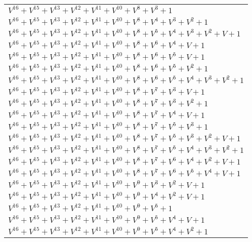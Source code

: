 \documentclass[12pt]{article}
\begin{document}
\begin{adjustwidth}{-4cm}{}
\begin{center}
\begin{longtable}{|l|}
$V^{16}  +V^{15}  +V^{13}  +V^{12}  +V^{11}  +V^{10}  +V^{8}  +V^{3}  + 1$ \\
$V^{16}  +V^{15}  +V^{13}  +V^{12}  +V^{11}  +V^{10}  +V^{8}  +V^{4}  +V^{3}  +V^{2}  + 1$ \\
$V^{16}  +V^{15}  +V^{13}  +V^{12}  +V^{11}  +V^{10}  +V^{8}  +V^{5}  +V^{4}  +V^{3}  +V^{2}  + V + 1$ \\
$V^{16}  +V^{15}  +V^{13}  +V^{12}  +V^{11}  +V^{10}  +V^{8}  +V^{6}  +V^{4}  + V + 1$ \\
$V^{16}  +V^{15}  +V^{13}  +V^{12}  +V^{11}  +V^{10}  +V^{8}  +V^{6}  +V^{5}  + V + 1$ \\
$V^{16}  +V^{15}  +V^{13}  +V^{12}  +V^{11}  +V^{10}  +V^{8}  +V^{6}  +V^{5}  +V^{2}  + 1$ \\
$V^{16}  +V^{15}  +V^{13}  +V^{12}  +V^{11}  +V^{10}  +V^{8}  +V^{6}  +V^{5}  +V^{4}  +V^{3}  +V^{2}  + 1$ \\
$V^{16}  +V^{15}  +V^{13}  +V^{12}  +V^{11}  +V^{10}  +V^{8}  +V^{7}  +V^{3}  + V + 1$ \\
$V^{16}  +V^{15}  +V^{13}  +V^{12}  +V^{11}  +V^{10}  +V^{8}  +V^{7}  +V^{3}  +V^{2}  + 1$ \\
$V^{16}  +V^{15}  +V^{13}  +V^{12}  +V^{11}  +V^{10}  +V^{8}  +V^{7}  +V^{4}  + V + 1$ \\
$V^{16}  +V^{15}  +V^{13}  +V^{12}  +V^{11}  +V^{10}  +V^{8}  +V^{7}  +V^{5}  +V^{3}  + 1$ \\
$V^{16}  +V^{15}  +V^{13}  +V^{12}  +V^{11}  +V^{10}  +V^{8}  +V^{7}  +V^{5}  +V^{3}  +V^{2}  + V + 1$ \\
$V^{16}  +V^{15}  +V^{13}  +V^{12}  +V^{11}  +V^{10}  +V^{8}  +V^{7}  +V^{5}  +V^{4}  +V^{3}  +V^{2}  + 1$ \\
$V^{16}  +V^{15}  +V^{13}  +V^{12}  +V^{11}  +V^{10}  +V^{8}  +V^{7}  +V^{6}  +V^{4}  +V^{2}  + V + 1$ \\
$V^{16}  +V^{15}  +V^{13}  +V^{12}  +V^{11}  +V^{10}  +V^{8}  +V^{7}  +V^{6}  +V^{5}  +V^{4}  + V + 1$ \\
$V^{16}  +V^{15}  +V^{13}  +V^{12}  +V^{11}  +V^{10}  +V^{9}  +V^{3}  +V^{2}  + V + 1$ \\
$V^{16}  +V^{15}  +V^{13}  +V^{12}  +V^{11}  +V^{10}  +V^{9}  +V^{4}  +V^{2}  + V + 1$ \\
$V^{16}  +V^{15}  +V^{13}  +V^{12}  +V^{11}  +V^{10}  +V^{9}  +V^{5}  + 1$ \\
$V^{16}  +V^{15}  +V^{13}  +V^{12}  +V^{11}  +V^{10}  +V^{9}  +V^{5}  +V^{4}  + V + 1$ \\
$V^{16}  +V^{15}  +V^{13}  +V^{12}  +V^{11}  +V^{10}  +V^{9}  +V^{5}  +V^{4}  +V^{2}  + 1$ \\

\end{longtable}
\end{center}
\end{adjustwidth}
\end{document}
